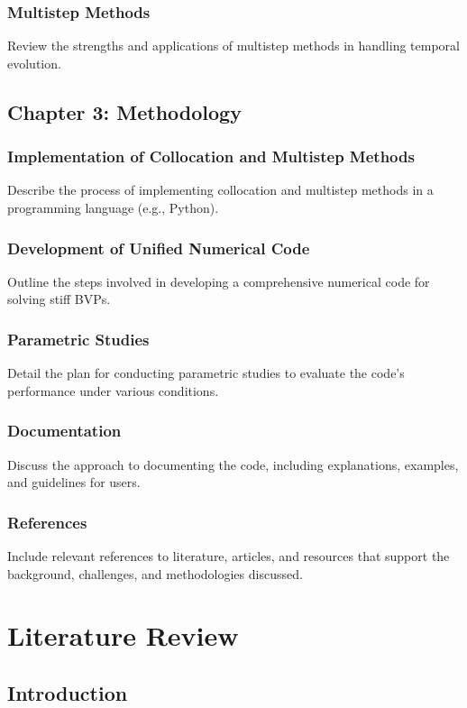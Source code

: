 \documentclass{report}
\begin{document}
\subsection{Multistep Methods}
Review the strengths and applications of multistep methods in handling temporal evolution.

\section{Chapter 3: Methodology}

\subsection{Implementation of Collocation and Multistep Methods}
Describe the process of implementing collocation and multistep methods in a programming language (e.g., Python).

\subsection{Development of Unified Numerical Code}
Outline the steps involved in developing a comprehensive numerical code for solving stiff BVPs.

\subsection{Parametric Studies}
Detail the plan for conducting parametric studies to evaluate the code's performance under various conditions.

\subsection{Documentation}
Discuss the approach to documenting the code, including explanations, examples, and guidelines for users.

\subsection{References}
Include relevant references to literature, articles, and resources that support the background, challenges, and methodologies discussed.

\chapter{Literature Review}

\section{Introduction}
\end{document}
